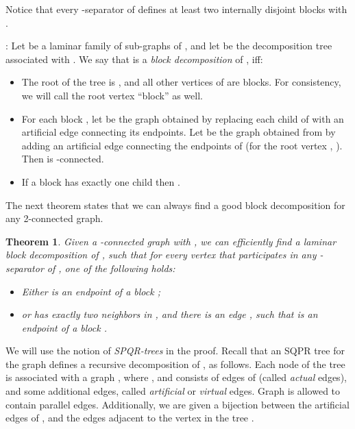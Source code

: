 \documentclass[twoside,leqno,twocolumn]{article}
\newtheorem{theorem}{Theorem}
\newenvironment{Definition}{{\bf Definition}: }{}
\begin{document}
Notice that every -separator  of  defines at least two internally disjoint blocks  with .

\begin{Definition}
Let  be a laminar family of sub-graphs of , and let  be the decomposition tree associated with . We say that  is a \emph{block decomposition} of , iff:

\begin{itemize}
\item The root of the tree  is , and all other vertices of  are blocks. For consistency, we will call the root vertex ``block'' as well.

\item For each block , let  be the graph obtained by replacing each child  of 
with an artificial edge connecting its endpoints. Let  be the graph obtained from  by adding an artificial edge connecting the endpoints of  (for the root vertex , ). Then  is -connected.\item If a block  has exactly one child  then .
\end{itemize} 
\end{Definition}



\iffull
The next theorem states that we can always find a good block decomposition for any 2-connected graph. 
\fi
{}\fi

\begin{theorem}\label{thm: block decomposition}
Given a -connected graph  with , we can efficiently find a laminar block decomposition  of , such that for
every vertex  that participates in any -separator  of , one of the following holds:
\iffull
\begin{itemize}
\item\fi Either  is an endpoint of a block ;
\iffull
\item\fi or   has exactly two neighbors in , and there is an edge , such that  is an endpoint of a block .
\iffull
\end{itemize}
\fi
\end{theorem}




\iffull



We will use the notion of \textit{SPQR-trees} in the proof. 
Recall that an SQPR tree  for the graph  defines a recursive decomposition
of , as follows. Each node  of the tree  is associated with a graph , where , and  consists of edges of  (called  \textit{actual} edges), and some additional edges, called \textit{artificial} or \textit{virtual} edges.
Graph  is allowed to contain parallel edges. Additionally, we are given a bijection  between the artificial edges of , and the edges adjacent to the vertex  in the tree .
\end{document}
